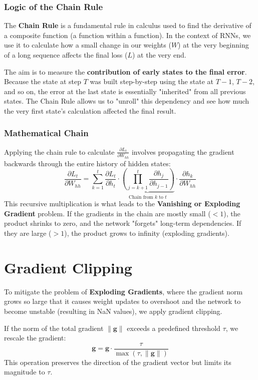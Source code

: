 \documentclass{article}
\begin{document}
\subsubsection{Logic of the Chain Rule}
The \textbf{Chain Rule} is a fundamental rule in calculus used to find the derivative of a composite function (a function within a function). In the context of RNNs, we use it to calculate how a small change in our weights ($W$) at the very beginning of a long sequence affects the final loss ($L$) at the very end.

The aim is to measure the \textbf{contribution of early states to the final error}. Because the state at step $T$ was built step-by-step using the state at $T-1$, $T-2$, and so on, the error at the last state is essentially "inherited" from all previous states. The Chain Rule allows us to "unroll" this dependency and see how much the very first state's calculation affected the final result.

\subsubsection{Mathematical Chain}
Applying the chain rule to calculate $\frac{\partial L_t}{\partial W_{hh}}$ involves propagating the gradient backwards through the entire history of hidden states:
\begin{equation}
\frac{\partial L_t}{\partial W_{hh}} = \sum_{k=1}^{t} \frac{\partial L_t}{\partial h_t} \cdot \underbrace{\left( \prod_{j=k+1}^{t} \frac{\partial h_j}{\partial h_{j-1}} \right)}_{\text{Chain from } k \text{ to } t} \cdot \frac{\partial h_k}{\partial W_{hh}}
\end{equation}
This recursive multiplication is what leads to the \textbf{Vanishing or Exploding Gradient} problem. If the gradients in the chain are mostly small ($< 1$), the product shrinks to zero, and the network "forgets" long-term dependencies. If they are large ($> 1$), the product grows to infinity (exploding gradients).

\section{Gradient Clipping}
To mitigate the problem of \textbf{Exploding Gradients}, where the gradient norm grows so large that it causes weight updates to overshoot and the network to become unstable (resulting in NaN values), we apply gradient clipping.

If the norm of the total gradient $\|\mathbf{g}\|$ exceeds a predefined threshold $\tau$, we rescale the gradient:
\begin{equation}
\mathbf{g} = \mathbf{g} \cdot \frac{\tau}{\max(\tau, \|\mathbf{g}\|)}
\end{equation}
This operation preserves the direction of the gradient vector but limits its magnitude to $\tau$.
\end{document}
